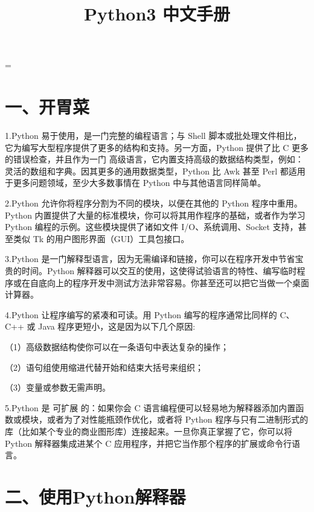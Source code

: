 \documentclass{article}
\begin{document}
 
\hfuzz=\maxdimen
{}
\begin{CJK}{UTF8}{gbsn}  
\title{Python3 中文手册}
\author{}
\date{}
\maketitle

\part*{一、开胃菜}
\subparagraph*{}
1.Python 易于使用，是一门完整的编程语言；与 Shell 脚本或批处理文件相比，它为编写大型程序提供了更多的结构和支持。另一方面，Python 提供了比 C 更多的错误检查，并且作为一门 高级语言，它内置支持高级的数据结构类型，例如：灵活的数组和字典。因其更多的通用数据类型，Python 比 Awk 甚至 Perl 都适用于更多问题领域，至少大多数事情在 Python 中与其他语言同样简单。
\subparagraph*{}
2.Python 允许你将程序分割为不同的模块，以便在其他的 Python 程序中重用。Python 内置提供了大量的标准模块，你可以将其用作程序的基础，或者作为学习 Python 编程的示例。这些模块提供了诸如文件 I/O、系统调用、Socket 支持，甚至类似 Tk 的用户图形界面（GUI）工具包接口。
\subparagraph*{}
3.Python 是一门解释型语言，因为无需编译和链接，你可以在程序开发中节省宝贵的时间。Python 解释器可以交互的使用，这使得试验语言的特性、编写临时程序或在自底向上的程序开发中测试方法非常容易。你甚至还可以把它当做一个桌面计算器。
\subparagraph*{}
4.Python 让程序编写的紧凑和可读。用 Python 编写的程序通常比同样的 C、C++ 或 Java 程序更短小，这是因为以下几个原因:
\subparagraph*{}
（1）高级数据结构使你可以在一条语句中表达复杂的操作；
\subparagraph*{}
（2）语句组使用缩进代替开始和结束大括号来组织；
\subparagraph*{}
（3）变量或参数无需声明。
\subparagraph*{}
5.Python 是 可扩展 的：如果你会 C 语言编程便可以轻易地为解释器添加内置函数或模块，或者为了对性能瓶颈作优化，或者将 Python 程序与只有二进制形式的库（比如某个专业的商业图形库）连接起来。一旦你真正掌握了它，你可以将 Python 解释器集成进某个 C 应用程序，并把它当作那个程序的扩展或命令行语言。
\part*{二、使用Python解释器}

\end{CJK}
\end{document}
